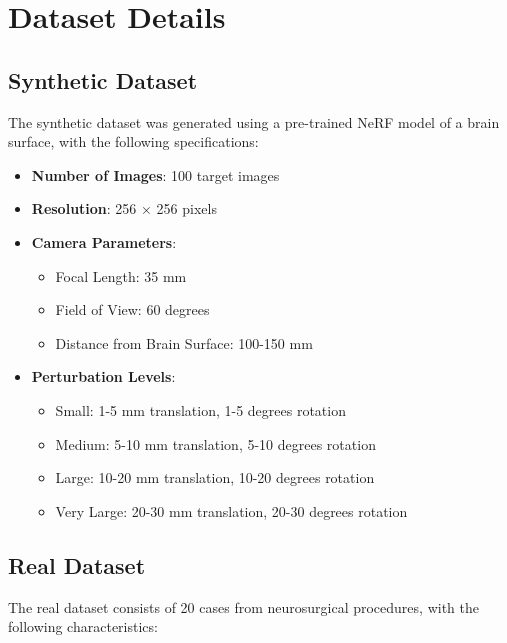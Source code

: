 \section{Dataset Details}

\subsection{Synthetic Dataset}
The synthetic dataset was generated using a pre-trained NeRF model of a brain surface, with the following specifications:

\begin{itemize}
    \item \textbf{Number of Images}: 100 target images
    \item \textbf{Resolution}: 256 × 256 pixels
    \item \textbf{Camera Parameters}: 
    \begin{itemize}
        \item Focal Length: 35 mm
        \item Field of View: 60 degrees
        \item Distance from Brain Surface: 100-150 mm
    \end{itemize}
    \item \textbf{Perturbation Levels}:
    \begin{itemize}
        \item Small: 1-5 mm translation, 1-5 degrees rotation
        \item Medium: 5-10 mm translation, 5-10 degrees rotation
        \item Large: 10-20 mm translation, 10-20 degrees rotation
        \item Very Large: 20-30 mm translation, 20-30 degrees rotation
    \end{itemize}
\end{itemize}

\subsection{Real Dataset}
The real dataset consists of 20 cases from neurosurgical procedures, with the following characteristics:

